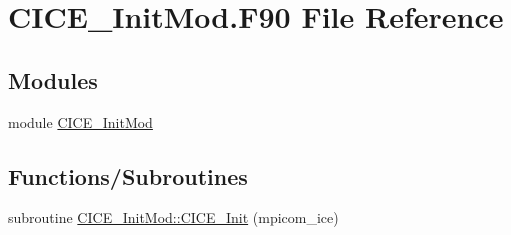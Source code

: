 \hypertarget{CICE__InitMod_8F90}{
\section{CICE\_\-InitMod.F90 File Reference}
\label{CICE__InitMod_8F90}
}
\subsection*{Modules}
\begin{DoxyCompactItemize}
\item 
module \hyperlink{namespaceCICE__InitMod}{CICE\_\-InitMod}
\end{DoxyCompactItemize}
\subsection*{Functions/Subroutines}
\begin{DoxyCompactItemize}
\item 
subroutine \hyperlink{namespaceCICE__InitMod_a51e5692821a3a0d09d140194fe266e8c}{CICE\_\-InitMod::CICE\_\-Init} (mpicom\_\-ice)
\end{DoxyCompactItemize}
